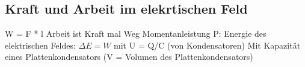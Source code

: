 \subsection*{Kraft und Arbeit im elekrtischen Feld}
    W = F * l Arbeit ist Kraft mal Weg
    Momentanleistung P:
    Energie des elektrischen Feldes: $\Delta E = W$
     mit U = Q/C (von Kondensatoren)
    Mit Kapazität eines Plattenkondensators (V = Volumen des Plattenkondensators)

